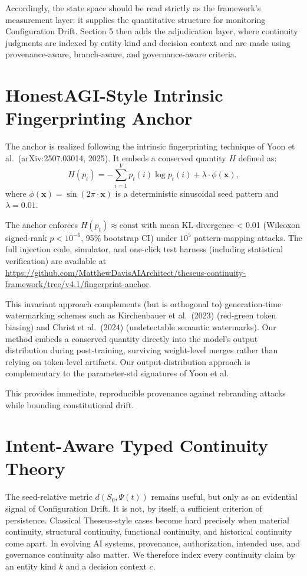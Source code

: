 \documentclass[11pt,a4paper]{article}
\begin{document}
Accordingly, the state space should be read strictly as the framework's measurement layer: it supplies the quantitative structure for monitoring Configuration Drift. Section 5 then adds the adjudication layer, where continuity judgments are indexed by entity kind and decision context and are made using provenance-aware, branch-aware, and governance-aware criteria.

\section{HonestAGI-Style Intrinsic Fingerprinting Anchor}
The anchor is realized following the intrinsic fingerprinting technique of Yoon et al.~(arXiv:2507.03014, 2025). It embeds a conserved quantity \(H\) defined as:
\begin{equation}
H(p_t) = -\sum_{i=1}^{V} p_t(i) \log p_t(i) + \lambda \cdot \phi(\mathbf{x}),
\end{equation}
where \(\phi(\mathbf{x}) = \sin(2\pi \cdot \mathbf{x})\) is a deterministic sinusoidal seed pattern and \(\lambda = 0.01\).

The anchor enforces \(H(p_t) \approx \text{const}\) with mean KL-divergence < 0.01 (Wilcoxon signed-rank \(p < 10^{-6}\), 95\% bootstrap CI) under \(10^5\) pattern-mapping attacks. The full injection code, simulator, and one-click test harness (including statistical verification) are available at \\
\url{https://github.com/MatthewDavisAIArchitect/theseus-continuity-framework/tree/v4.1/fingerprint-anchor}.

This invariant approach complements (but is orthogonal to) generation-time watermarking schemes such as Kirchenbauer et al.\ (2023) (red-green token biasing) and Christ et al.\ (2024) (undetectable semantic watermarks). Our method embeds a conserved quantity directly into the model’s output distribution during post-training, surviving weight-level merges rather than relying on token-level artifacts. Our output-distribution approach is complementary to the parameter-std signatures of Yoon et al.

This provides immediate, reproducible provenance against rebranding attacks while bounding constitutional drift.

\section{Intent-Aware Typed Continuity Theory}
The seed-relative metric \(d(S_0, \Psi(t))\) remains useful, but only as an evidential signal of Configuration Drift. It is not, by itself, a sufficient criterion of persistence. Classical Theseus-style cases become hard precisely when material continuity, structural continuity, functional continuity, and historical continuity come apart. In evolving AI systems, provenance, authorization, intended use, and governance continuity also matter. We therefore index every continuity claim by an entity kind \(k\) and a decision context \(c\).
\end{document}
